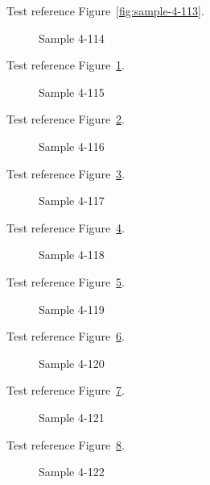 Test reference Figure~\ref{fig:sample-4-113}.

\begin{figure}[tbhp]
\caption{Sample 4-114}
\label{fig:sample-4-114}
\end{figure}

Test reference Figure~\ref{fig:sample-4-114}.

\begin{figure}[tbhp]
\caption{Sample 4-115}
\label{fig:sample-4-115}
\end{figure}

Test reference Figure~\ref{fig:sample-4-115}.

\begin{figure}[tbhp]
\caption{Sample 4-116}
\label{fig:sample-4-116}
\end{figure}

Test reference Figure~\ref{fig:sample-4-116}.

\begin{figure}[tbhp]
\caption{Sample 4-117}
\label{fig:sample-4-117}
\end{figure}

Test reference Figure~\ref{fig:sample-4-117}.

\begin{figure}[tbhp]
\caption{Sample 4-118}
\label{fig:sample-4-118}
\end{figure}

Test reference Figure~\ref{fig:sample-4-118}.

\begin{figure}[tbhp]
\caption{Sample 4-119}
\label{fig:sample-4-119}
\end{figure}

Test reference Figure~\ref{fig:sample-4-119}.

\begin{figure}[tbhp]
\caption{Sample 4-120}
\label{fig:sample-4-120}
\end{figure}

Test reference Figure~\ref{fig:sample-4-120}.

\begin{figure}[tbhp]
\caption{Sample 4-121}
\label{fig:sample-4-121}
\end{figure}

Test reference Figure~\ref{fig:sample-4-121}.

\begin{figure}[tbhp]
\caption{Sample 4-122}
\label{fig:sample-4-122}
\end{figure}

